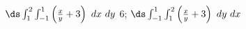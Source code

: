 {$\ds \int_1^2\int_{-1}^1\left(\frac xy+3\right)\ dx\ dy$\label{13_02_ex_05}
}
{6; $\ds \int_{-1}^1\int_{1}^2\left(\frac xy+3\right)\ dy\ dx$
}
